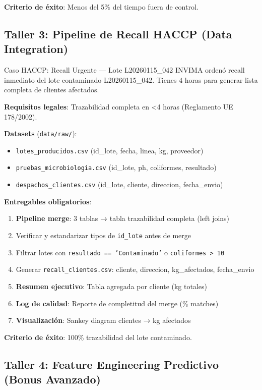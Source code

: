 \documentclass[11pt, a4paper]{article}
\begin{document}
\textbf{Criterio de éxito}: Menos del 5\% del tiempo fuera de control.

\subsection{Taller 3: Pipeline de Recall HACCP (Data Integration)}

\begin{industrybox}{Caso HACCP: Recall Urgente — Lote L20260115\_042}
INVIMA ordenó recall inmediato del lote contaminado L20260115\_042. Tienes 4 horas para generar lista completa de clientes afectados.

\textbf{Requisitos legales}: Trazabilidad completa en <4 horas (Reglamento UE 178/2002).
\end{industrybox}

\textbf{Datasets} (\texttt{data/raw/}):
\begin{itemize}
    \item \texttt{lotes\_producidos.csv} (id\_lote, fecha, linea, kg, proveedor)
    \item \texttt{pruebas\_microbiologia.csv} (id\_lote, ph, coliformes, resultado)
    \item \texttt{despachos\_clientes.csv} (id\_lote, cliente, direccion, fecha\_envio)
\end{itemize}

\textbf{Entregables obligatorios}:
\begin{enumerate}
    \item \textbf{Pipeline merge}: 3 tablas → tabla trazabilidad completa (left joins)
    \item Verificar y estandarizar tipos de \texttt{id\_lote} antes de merge
    \item Filtrar lotes con \texttt{resultado == 'Contaminado'} o \texttt{coliformes > 10}
    \item Generar \texttt{recall\_clientes.csv}: cliente, direccion, kg\_afectados, fecha\_envio
    \item \textbf{Resumen ejecutivo}: Tabla agregada por cliente (kg totales)
    \item \textbf{Log de calidad}: Reporte de completitud del merge (\% matches)
    \item \textbf{Visualización}: Sankey diagram clientes → kg afectados
\end{enumerate}

\textbf{Criterio de éxito}: 100\% trazabilidad del lote contaminado.

\subsection{Taller 4: Feature Engineering Predictivo (Bonus Avanzado)}
\end{document}
